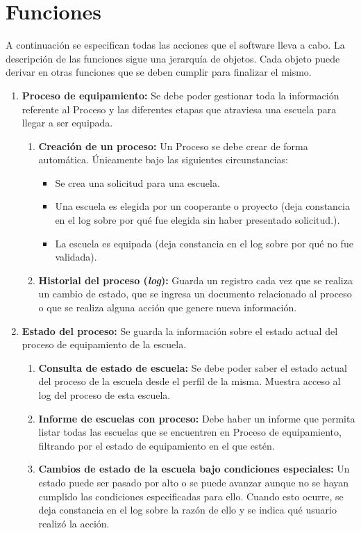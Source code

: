 \documentclass[11pt]{report}
\newcommand{\requisito}[2]{\textbf{#1:} #2}
\begin{document}
	\section{Funciones}
	A continuación se especifican todas las acciones que el software lleva a cabo. La descripción de las funciones sigue una jerarquía de objetos. Cada objeto puede derivar en otras funciones que se deben cumplir para finalizar el mismo.
	\begin{enumerate}[leftmargin=0.8cm]
		\item \requisito{Proceso de equipamiento}{Se debe poder gestionar toda la información referente al Proceso y las diferentes etapas que atraviesa una escuela para llegar a ser equipada.}
		\begin{enumerate}
			\item \requisito{Creación de un proceso}{Un Proceso se debe crear de forma automática. Únicamente bajo las siguientes circunstancias:
				\begin{itemize}
					\item Se crea una solicitud para una escuela.
					\item Una escuela es elegida por un cooperante o proyecto (deja constancia en el log sobre por qué fue elegida sin haber presentado solicitud.).
					\item La escuela es equipada (deja constancia en el log sobre por qué no fue validada).
				\end{itemize}
			}
			\item \requisito{Historial del proceso (\textit{log})}{Guarda un registro cada vez que se realiza un cambio de estado, que se ingresa un documento relacionado al proceso o que se realiza alguna acción que genere nueva información.}
		\end{enumerate}
		
		\item \requisito{Estado del proceso}{Se guarda la información sobre el estado actual del proceso de equipamiento de la escuela.}
		\begin{enumerate}
			\item \requisito{Consulta de estado de escuela}{Se debe poder saber el estado actual del proceso de la escuela desde el perfil de la misma. Muestra acceso al log del proceso de esta escuela.}
			\item \requisito{Informe de escuelas con proceso}{Debe haber un informe que permita listar todas las escuelas que se encuentren en Proceso de equipamiento, filtrando por el estado de equipamiento en el que estén.}
			\item \requisito{Cambios de estado de la escuela bajo condiciones especiales}{Un estado puede ser pasado por alto o se puede avanzar aunque no se hayan cumplido las condiciones especificadas para ello. Cuando esto ocurre, se deja constancia en el log sobre la razón de ello y se indica qué usuario realizó la acción.}
		\end{enumerate}
		

\end{enumerate}
\end{document}

